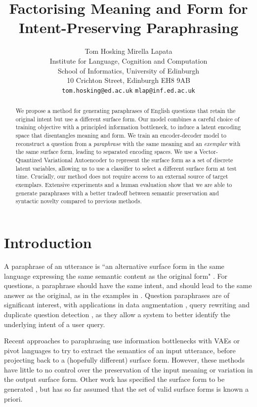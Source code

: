 \documentclass[11pt,a4paper]{article}
\title{Factorising Meaning and Form for Intent-Preserving Paraphrasing}
\author{{Tom Hosking \qquad
  Mirella Lapata} \\
  Institute for Language, Cognition and Computation \\
  School of Informatics, University of Edinburgh \\
  10 Crichton Street, Edinburgh EH8 9AB\\
  \texttt{tom.hosking@ed.ac.uk} \quad \texttt{mlap@inf.ed.ac.uk}}
\date{}
\begin{document}
\maketitle
\begin{abstract}
  We propose a method for generating paraphrases of English questions
  that retain the original intent but use a different surface
  form. Our model combines a careful choice of training objective with
  a principled information bottleneck, to induce a latent encoding
  space that disentangles meaning and form. We train an
  encoder-decoder model to reconstruct a question from a
  \textit{paraphrase} with the same meaning and an \textit{exemplar}
  with the same surface form, leading to separated encoding spaces. We
  use a Vector-Quantized Variational Autoencoder to represent the
  surface form as a set of discrete latent variables, allowing us to
  use a classifier to select a different surface form at test
  time. Crucially, our method does not require access to an external
  source of target exemplars.  Extensive experiments and a human
  evaluation show that we are able to generate paraphrases with a
  better tradeoff between semantic preservation and syntactic novelty
  compared to previous methods.




\end{abstract}

\section{Introduction}

A paraphrase of an utterance is ``an alternative surface form in the
same language expressing the same semantic content as the original
form" \cite{madnanidorr}. For questions, a paraphrase should have the
same intent, and should lead to the same answer as the original, as in
the examples in . Question paraphrases are of
significant interest, with applications in data augmentation
\cite{iyyer-etal-2018-adversarial}, query rewriting
\cite{dong-etal-2017-learning-paraphrase} and duplicate question
detection \cite{shah-etal-2018-adversarial}, as they allow a system to
better identify the underlying intent of a user query.

Recent approaches to paraphrasing use information bottlenecks with
VAEs \cite{bowman-etal-2016-generating} or pivot languages
\cite{wieting-gimpel-2018-paranmt} to try to extract the semantics of
an input utterance, before projecting back to a (hopefully different)
surface form. However, these methods have little to no control over
the preservation of the input meaning or variation in the output
surface form. Other work has specified the surface form to be
generated
\cite{iyyer-etal-2018-adversarial,chen-etal-2019-controllable,sgcp2020},
but has so far assumed that the set of valid surface forms is known a
priori.
\end{document}

